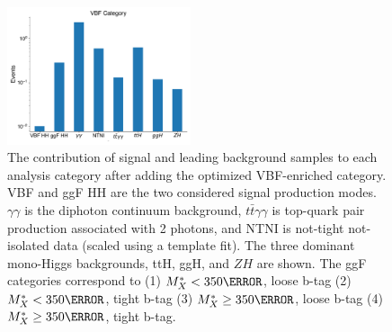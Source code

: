 \begin{figure}[p!]
  \includegraphics[width=0.48\textwidth]{chapters/chapter6_vbf/images/category_breakdown/vbfcat.pdf}
  \caption[The contribution of signal and leading background samples to each analysis category after adding the optimized VBF-enriched category]{The contribution of signal and leading background samples to each analysis category after adding the optimized VBF-enriched category. VBF and ggF HH are the two considered signal production modes. $\gamma \gamma$ is the diphoton continuum background, $t\bar{t}\gamma\gamma$ is top-quark pair production associated with 2 photons, and NTNI is not-tight not-isolated data (scaled using a template fit). The three dominant mono-Higgs backgrounds, ttH, ggH, and $ZH$ are shown. The \gls{ggF} categories correspond to (1) $M_X^{*} < \unit{350}{\GeV}$, loose b-tag (2) $M_X^{*} < \unit{350}{\GeV}$, tight b-tag (3) $M_X^{*} \geq \unit{350}{\GeV}$, loose b-tag (4) $M_X^{*} \geq \unit{350}{\GeV}$, tight b-tag.}
  \label{fig:category-yields}
\end{figure}


